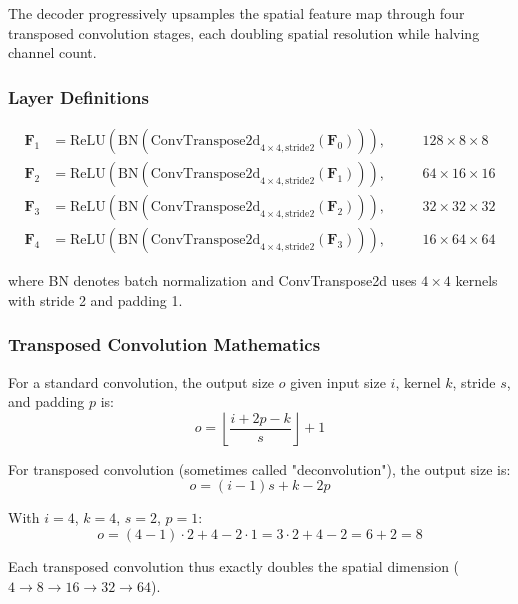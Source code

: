 \documentclass[12pt,a4paper,oneside]{report}
\begin{document}
The decoder progressively upsamples the spatial feature map through four transposed convolution stages, each doubling spatial resolution while halving channel count.

\subsubsection{Layer Definitions}

\begin{align}
\mathbf{F}_1 &= \text{ReLU}(\text{BN}(\text{ConvTranspose2d}_{4\times4,\text{stride}2}(\mathbf{F}_0))), &\quad &128 \times 8 \times 8 \\
\mathbf{F}_2 &= \text{ReLU}(\text{BN}(\text{ConvTranspose2d}_{4\times4,\text{stride}2}(\mathbf{F}_1))), &\quad &64 \times 16 \times 16 \\
\mathbf{F}_3 &= \text{ReLU}(\text{BN}(\text{ConvTranspose2d}_{4\times4,\text{stride}2}(\mathbf{F}_2))), &\quad &32 \times 32 \times 32 \\
\mathbf{F}_4 &= \text{ReLU}(\text{BN}(\text{ConvTranspose2d}_{4\times4,\text{stride}2}(\mathbf{F}_3))), &\quad &16 \times 64 \times 64
\end{align}

where BN denotes batch normalization and ConvTranspose2d uses $4 \times 4$ kernels with stride 2 and padding 1.

\subsubsection{Transposed Convolution Mathematics}

For a standard convolution, the output size $o$ given input size $i$, kernel $k$, stride $s$, and padding $p$ is:
\begin{equation}
o = \left\lfloor \frac{i + 2p - k}{s} \right\rfloor + 1
\end{equation}

For transposed convolution (sometimes called "deconvolution"), the output size is:
\begin{equation}
o = (i - 1)s + k - 2p
\end{equation}

With $i=4$, $k=4$, $s=2$, $p=1$:
\begin{equation}
o = (4 - 1)\cdot 2 + 4 - 2\cdot 1 = 3\cdot 2 + 4 - 2 = 6 + 2 = 8
\end{equation}

Each transposed convolution thus exactly doubles the spatial dimension ($4 \rightarrow 8 \rightarrow 16 \rightarrow 32 \rightarrow 64$).
\end{document}
